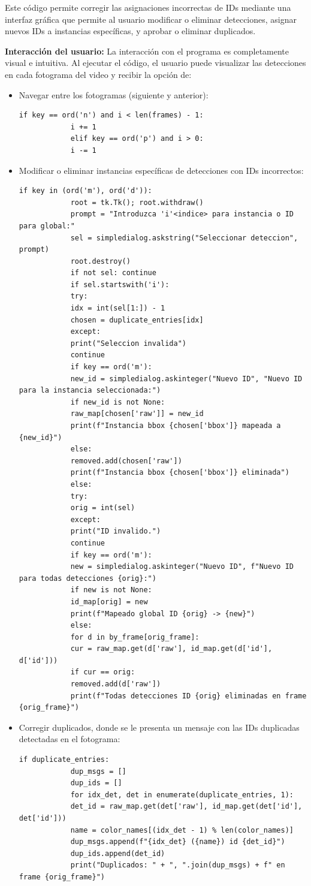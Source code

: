 \documentclass[12pt, a4paper, twoside]{article}
\begin{document}
	Este código permite corregir las asignaciones incorrectas de IDs mediante una interfaz gráfica que permite al usuario modificar o eliminar detecciones, asignar nuevos IDs a instancias específicas, y aprobar o eliminar duplicados.
	
	\textbf{Interacción del usuario:} La interacción con el programa es completamente visual e intuitiva. Al ejecutar el código, el usuario puede visualizar las detecciones en cada fotograma del video y recibir la opción de:
	
	\begin{itemize}
		\item Navegar entre los fotogramas (siguiente y anterior):
		\begin{lstlisting}[style=pythonstyle]
			if key == ord('n') and i < len(frames) - 1:
			i += 1
			elif key == ord('p') and i > 0:
			i -= 1
		\end{lstlisting}
		
		\item Modificar o eliminar instancias específicas de detecciones con IDs incorrectos:
		\begin{lstlisting}[style=pythonstyle]
			if key in (ord('m'), ord('d')):
			root = tk.Tk(); root.withdraw()
			prompt = "Introduzca 'i'<indice> para instancia o ID para global:"
			sel = simpledialog.askstring("Seleccionar deteccion", prompt)
			root.destroy()
			if not sel: continue
			if sel.startswith('i'):
			try:
			idx = int(sel[1:]) - 1
			chosen = duplicate_entries[idx]
			except:
			print("Seleccion invalida")
			continue
			if key == ord('m'):
			new_id = simpledialog.askinteger("Nuevo ID", "Nuevo ID para la instancia seleccionada:")
			if new_id is not None:
			raw_map[chosen['raw']] = new_id
			print(f"Instancia bbox {chosen['bbox']} mapeada a {new_id}")
			else:
			removed.add(chosen['raw'])
			print(f"Instancia bbox {chosen['bbox']} eliminada")
			else:
			try:
			orig = int(sel)
			except:
			print("ID invalido.")
			continue
			if key == ord('m'):
			new = simpledialog.askinteger("Nuevo ID", f"Nuevo ID para todas detecciones {orig}:")
			if new is not None:
			id_map[orig] = new
			print(f"Mapeado global ID {orig} -> {new}")
			else:
			for d in by_frame[orig_frame]:
			cur = raw_map.get(d['raw'], id_map.get(d['id'], d['id']))
			if cur == orig:
			removed.add(d['raw'])
			print(f"Todas detecciones ID {orig} eliminadas en frame {orig_frame}")
		\end{lstlisting}
		
		\item Corregir duplicados, donde se le presenta un mensaje con las IDs duplicadas detectadas en el fotograma:
		\begin{lstlisting}[style=pythonstyle]
			if duplicate_entries:
			dup_msgs = []
			dup_ids = []
			for idx_det, det in enumerate(duplicate_entries, 1):
			det_id = raw_map.get(det['raw'], id_map.get(det['id'], det['id']))
			name = color_names[(idx_det - 1) % len(color_names)]
			dup_msgs.append(f"{idx_det} ({name}) id {det_id}")
			dup_ids.append(det_id)
			print("Duplicados: " + ", ".join(dup_msgs) + f" en frame {orig_frame}")
		\end{lstlisting}
		

\end{itemize}
\end{document}
